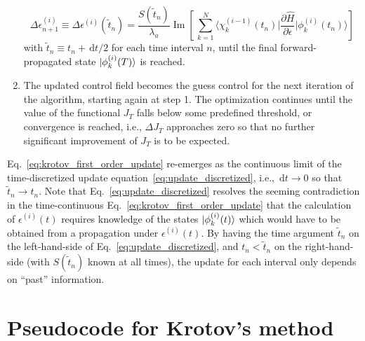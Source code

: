 \documentclass[submission, Phys]{SciPost}
\newcommand{\Op}[1]{\hat{#1}}
\newcommand{\dd}[0]{\,\text{d}}
\renewcommand{\Im}[0]{\operatorname{Im}}
\begin{document}
\begin{enumerate}
\begin{equation}
      \label{eq:update_discretized}
      \Delta\epsilon^{(i)}_{n+1}
      \equiv \Delta\epsilon^{(i)}(\tilde{t}_n)
      = \frac{S(\tilde{t}_n)}{\lambda_{a}} \Im \left[\,
          \sum_{k=1}^{N} \bigg\langle \chi_k^{(i-1)}(t_n) \bigg\vert
          \frac{\partial \Op{H}}{\partial \epsilon}
          \bigg\vert \phi_k^{(i)}(t_n) \bigg\rangle
        \right]
    \end{equation}
    with $\tilde{t}_n \equiv t_n + \dd t / 2$
    for each time interval $n$, until the final forward-propagated
    state \(\ket{\phi^{(i)}_k(T)}\) is reached.
  \item
    The updated control field becomes the guess control for the next iteration
    of the algorithm, starting again at step 1.
    The optimization continues until the value of the functional $J_T$ falls
    below some predefined threshold, or convergence is reached, i.e., $\Delta
    J_T$ approaches zero so that no further significant improvement of $J_T$ is
    to be expected.
\end{enumerate}
Eq.~\eqref{eq:krotov_first_order_update} re-emerges as the continuous limit of
the time-discretized update equation~\eqref{eq:update_discretized}, i.e.,
$\dd t \rightarrow 0$ so that $\tilde{t}_n \rightarrow t_n$.
Note that Eq.~\eqref{eq:update_discretized} resolves the seeming contradiction
in the time-continuous Eq.~\eqref{eq:krotov_first_order_update} that the
calculation of $\epsilon^{(i)}(t)$ requires knowledge of the states
$\ket{\phi_k^{(i)}(t)}$ which would have to be obtained from a propagation under
$\epsilon^{(i)}(t)$.
By having the time argument $\tilde{t}_n$ on the left-hand-side of
Eq.~\eqref{eq:update_discretized}, and $t_n < \tilde{t}_n$ on the
right-hand-side (with $S(\tilde{t}_n)$ known at all times), the update for each
interval only depends on ``past'' information.


\section{Pseudocode for Krotov's method}%
\label{apx:pseudocode}
\end{document}
